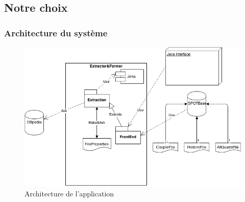 \documentclass[12pt,a4	]{report}
\begin{document}
\subsection*{Notre choix}
\subsubsection*{Architecture du système}
 \begin{figure}[H]
        \centering
                \includegraphics[width=13cm]{Architecture.png}
               \caption{Architecture de l'application}
\end{figure}
\end{document}
